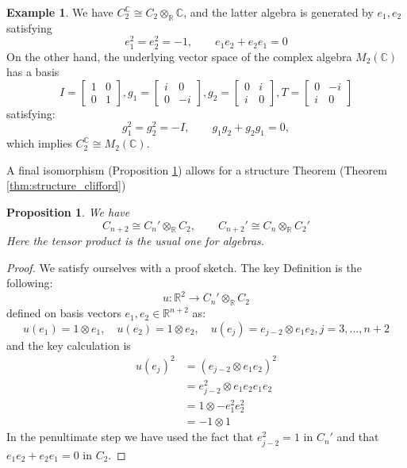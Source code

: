 \documentclass[12pt]{article}
\theoremstyle{plain}
\newtheorem{proposition}[thm]{Proposition}
\theoremstyle{definition}
\newtheorem{example}[thm]{Example}
\newcommand{\bb}[1]{\mathbb{#1}}
\newcommand{\lto}{\longrightarrow}
\begin{document}
\begin{example}\label{ex:em_two}
	We have $C_2^{\bb{C}} \cong C_2 \otimes_{\bb{R}}\bb{C}$, and the latter algebra is generated by $e_1,e_2$ satisfying
	\begin{equation}\label{eq:clifford_c_2}
		e_1^2 = e_2^2 = -1,\qquad e_1e_2 + e_2e_1 = 0
	\end{equation}
	On the other hand, the underlying vector space of the complex algebra $M_2(\bb{C})$ has a basis
	\begin{equation}
		I = \begin{bmatrix}
			1 & 0\\
			0 & 1
		\end{bmatrix}
		, g_1 = 
		\begin{bmatrix}
			i & 0\\
			0 & -i
		\end{bmatrix}, g_2 =
		\begin{bmatrix}
			0 & i \\
			i & 0
		\end{bmatrix}, T = 
		\begin{bmatrix}
			0 & -i\\
			i & 0
		\end{bmatrix}
	\end{equation}
	satisfying:
	\begin{equation}\label{eq:generators_matrices}
		g_1^2 = g_2^2 = -I,\qquad g_1g_2 + g_2g_1 = 0,
	\end{equation}
	which implies $C_2^{\bb{C}} \cong M_2(\bb{C})$.
\end{example}
A final isomorphism (Proposition \ref{prop:complex_plus_two}) allows for a structure Theorem (Theorem \ref{thm:structure_clifford})
\begin{proposition}\label{prop:complex_plus_two}
	We have
	\begin{equation}
		C_{n+2} \cong C_n' \otimes_{\bb{R}}C_2,\qquad C_{n+2}' \cong C_n \otimes_{\bb{R}}C_2'
	\end{equation}
	Here the tensor product is the usual one for algebras.
\end{proposition}
\begin{proof}
	We satisfy ourselves with a proof sketch. The key Definition is the following:
	\begin{equation}
		u: \bb{R}^2 \lto C_n' \otimes_{\bb{R}}C_2
	\end{equation}
	defined on basis vectors $e_1,e_2 \in \bb{R}^{n+2}$ as:
	\begin{equation}
		u(e_1) = 1 \otimes e_1,\quad u(e_2) = 1 \otimes e_2,\quad u(e_j) = e_{j-2} \otimes e_1e_2, j = 3,...,n+2
	\end{equation}
	and the key calculation is
	\begin{align*}
		u(e_j)^2 &= (e_{j - 2} \otimes e_1e_2)^2\\
		&= e_{j-2}^2 \otimes e_1e_2e_1e_2\\
		&= 1 \otimes -e_1^2e_2^2\\
		&= -1 \otimes 1
	\end{align*}
In the penultimate step we have used the fact that $e_{j-2}^2 = 1$ in $C_n'$ and that $e_1e_2 + e_2e_1 = 0$ in $C_2$.
\end{proof}
\end{document}
